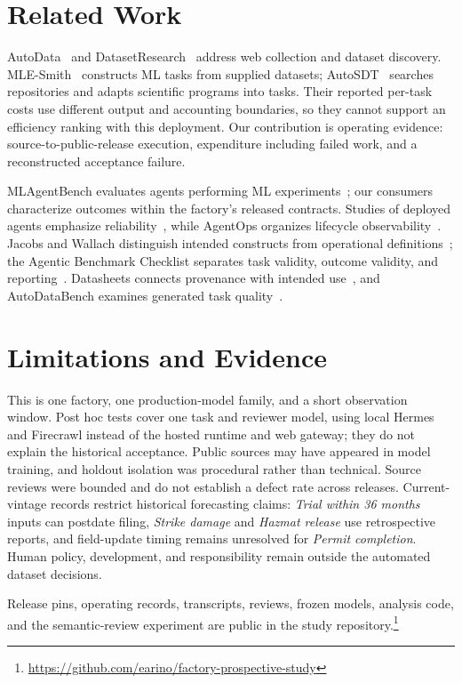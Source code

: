 \documentclass[conference,10pt,letterpaper]{IEEEtran}
\begin{document}
\section{Related Work}
AutoData~\cite{autodata-web} and DatasetResearch~\cite{datasetresearch} address web collection and dataset discovery. MLE-Smith~\cite{qiang2026mlesmith} constructs ML tasks from supplied datasets; AutoSDT~\cite{autosdt} searches repositories and adapts scientific programs into tasks. Their reported per-task costs use different output and accounting boundaries, so they cannot support an efficiency ranking with this deployment. Our contribution is operating evidence: source-to-public-release execution, expenditure including failed work, and a reconstructed acceptance failure.

MLAgentBench evaluates agents performing ML experiments~\cite{mlagentbench}; our consumers characterize outcomes within the factory's released contracts. Studies of deployed agents emphasize reliability~\cite{production}, while AgentOps organizes lifecycle observability~\cite{agentops}. Jacobs and Wallach distinguish intended constructs from operational definitions~\cite{measurement}; the Agentic Benchmark Checklist separates task validity, outcome validity, and reporting~\cite{abc}. Datasheets connects provenance with intended use~\cite{datasheets}, and AutoDataBench examines generated task quality~\cite{autodatabench}.

\section{Limitations and Evidence}
This is one factory, one production-model family, and a short observation window. Post hoc tests cover one task and reviewer model, using local Hermes and Firecrawl instead of the hosted runtime and web gateway; they do not explain the historical acceptance. Public sources may have appeared in model training, and holdout isolation was procedural rather than technical. Source reviews were bounded and do not establish a defect rate across releases. Current-vintage records restrict historical forecasting claims: \emph{Trial within 36 months} inputs can postdate filing, \emph{Strike damage} and \emph{Hazmat release} use retrospective reports, and field-update timing remains unresolved for \emph{Permit completion}. Human policy, development, and responsibility remain outside the automated dataset decisions.

Release pins, operating records, transcripts, reviews, frozen models, analysis code, and the semantic-review experiment are public in the study repository.\footnote{\url{https://github.com/earino/factory-prospective-study}}
\end{document}
